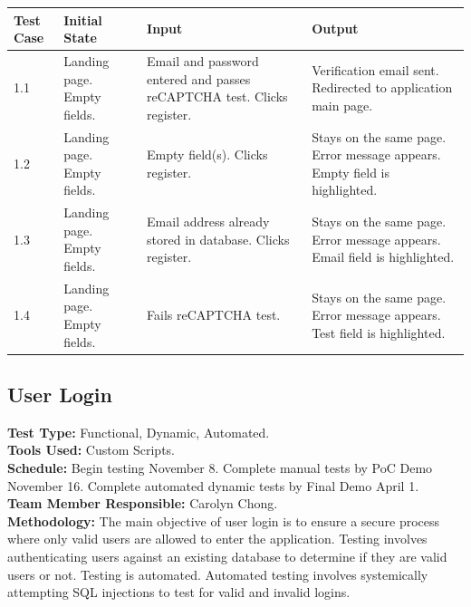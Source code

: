 \documentclass[12pt]{article}
\begin{document}
\begin{longtable}{|p{2cm}|p{3cm}|p{5cm}|p{5cm}|}
\hline
\textbf{Test Case}  & \textbf{Initial State} & \textbf{Input} & \textbf{Output} \\ \hline
1.1 & Landing page. Empty fields. & Email and password entered and passes reCAPTCHA test. Clicks register. & Verification email sent. Redirected to application main page. \\ 
\hline
1.2 & Landing page. Empty fields. & Empty field(s). Clicks register. & Stays on the same page. Error message appears. Empty field is highlighted. \\
\hline
1.3 & Landing page. Empty fields. & Email address already stored in database. Clicks register. & Stays on the same page. Error message appears. Email field is highlighted. \\
\hline
1.4 & Landing page. Empty fields. & Fails reCAPTCHA test. & Stays on the same page. Error message appears. Test field is highlighted. \\
\hline
\end{longtable}



\subsection{User Login}
\textbf{Test Type:} Functional, Dynamic, Automated. \\
\textbf{Tools Used:} Custom Scripts. \\
\textbf{Schedule:} Begin testing November 8. Complete manual tests by PoC Demo November 16. Complete automated dynamic tests by Final Demo April 1. \\
\textbf{Team Member Responsible:} Carolyn Chong. \\
\textbf{Methodology:} The main objective of user login is to ensure a secure process where only valid users are allowed to enter the application. Testing involves authenticating users against an existing database to determine if they are valid users or not. Testing is automated. Automated testing involves systemically attempting SQL injections to test for valid and invalid logins.
\end{document}
